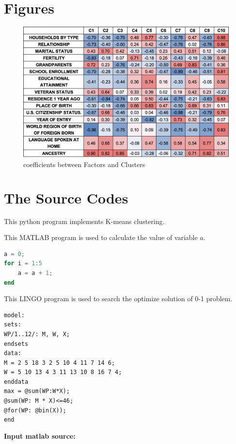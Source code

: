 \documentclass[11pt]{article}
\begin{document}
\clearpage
\begin{appendices}
\section{Figures}
\begin{figure}[H]
	\centering
	\includegraphics[scale=0.5]{./figures/a1.png}
	\caption{coefficients between Factors and Clusters}
\end{figure}

\section{The Source Codes}		%


This python program implements K-means clustering.


This MATLAB program is used to calculate the value of variable $a$.
\begin{lstlisting}[language={Matlab}, caption=\texttt{temp.m}]
a = 0;
for i = 1:5
	a = a + 1;
end
\end{lstlisting}

This LINGO program is used to search the optimize solution of 0-1 problem.
\begin{lstlisting}[language=Lingo, caption=\texttt{temp.lg4}]
model:
sets:
WP/1..12/: M, W, X;
endsets
data:
M = 2 5 18 3 2 5 10 4 11 7 14 6;
W = 5 10 13 4 3 11 13 10 8 16 7 4;
enddata
max = @sum(WP:W*X);
@sum(WP: M * X)<=46;
@for(WP: @bin(X));
end
\end{lstlisting}

\textbf{\textcolor[rgb]{0.98,0.00,0.00}{Input matlab source:}}
% 

\end{appendices}
\end{document}

